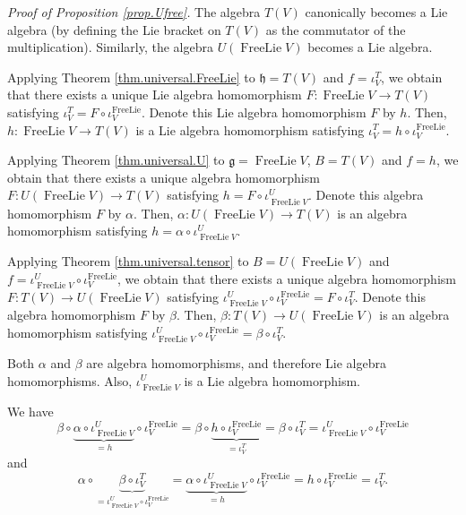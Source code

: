 \documentclass[etingof-lie.tex]{subfiles}
\begin{document}
\textit{Proof of Proposition \ref{prop.Ufree}.} The algebra $T\left(
V\right)  $ canonically becomes a Lie algebra (by defining the Lie bracket on
$T\left(  V\right)  $ as the commutator of the multiplication). Similarly, the
algebra $U\left(  \operatorname*{FreeLie}V\right)  $ becomes a Lie algebra.

Applying Theorem \ref{thm.universal.FreeLie} to $\mathfrak{h}=T\left(
V\right)  $ and $f=\iota_{V}^{T}$, we obtain that there exists a unique Lie
algebra homomorphism $F:\operatorname*{FreeLie}V\rightarrow T\left(  V\right)
$ satisfying $\iota_{V}^{T}=F\circ\iota_{V}^{\operatorname*{FreeLie}}$. Denote
this Lie algebra homomorphism $F$ by $h$. Then, $h:\operatorname*{FreeLie}%
V\rightarrow T\left(  V\right)  $ is a Lie algebra homomorphism satisfying
$\iota_{V}^{T}=h\circ\iota_{V}^{\operatorname*{FreeLie}}$.

Applying Theorem \ref{thm.universal.U} to $\mathfrak{g}%
=\operatorname*{FreeLie}V$, $B=T\left(  V\right)  $ and $f=h$, we obtain that
there exists a unique algebra homomorphism $F:U\left(  \operatorname*{FreeLie}%
V\right)  \rightarrow T\left(  V\right)  $ satisfying $h=F\circ\iota
_{\operatorname*{FreeLie}V}^{U}$. Denote this algebra homomorphism $F$ by
$\alpha$. Then, $\alpha:U\left(  \operatorname*{FreeLie}V\right)  \rightarrow
T\left(  V\right)  $ is an algebra homomorphism satisfying $h=\alpha\circ
\iota_{\operatorname*{FreeLie}V}^{U}$.

Applying Theorem \ref{thm.universal.tensor} to $B=U\left(
\operatorname*{FreeLie}V\right)  $ and $f=\iota_{\operatorname*{FreeLie}V}%
^{U}\circ\iota_{V}^{\operatorname*{FreeLie}}$, we obtain that there exists a
unique algebra homomorphism $F:T\left(  V\right)  \rightarrow U\left(
\operatorname*{FreeLie}V\right)  $ satisfying $\iota_{\operatorname*{FreeLie}%
V}^{U}\circ\iota_{V}^{\operatorname*{FreeLie}}=F\circ\iota_{V}^{T}$. Denote
this algebra homomorphism $F$ by $\beta$. Then, $\beta:T\left(  V\right)
\rightarrow U\left(  \operatorname*{FreeLie}V\right)  $ is an algebra
homomorphism satisfying $\iota_{\operatorname*{FreeLie}V}^{U}\circ\iota
_{V}^{\operatorname*{FreeLie}}=\beta\circ\iota_{V}^{T}$.

Both $\alpha$ and $\beta$ are algebra homomorphisms, and therefore Lie algebra
homomorphisms. Also, $\iota_{\operatorname*{FreeLie}V}^{U}$ is a Lie algebra homomorphism.

We have%
\[
\beta\circ\underbrace{\alpha\circ\iota_{\operatorname*{FreeLie}V}^{U}}%
_{=h}\circ\iota_{V}^{\operatorname*{FreeLie}}=\beta\circ\underbrace{h\circ
\iota_{V}^{\operatorname*{FreeLie}}}_{=\iota_{V}^{T}}=\beta\circ\iota_{V}%
^{T}=\iota_{\operatorname*{FreeLie}V}^{U}\circ\iota_{V}%
^{\operatorname*{FreeLie}}%
\]
and%
\[
\alpha\circ\underbrace{\beta\circ\iota_{V}^{T}}_{=\iota
_{\operatorname*{FreeLie}V}^{U}\circ\iota_{V}^{\operatorname*{FreeLie}}%
}=\underbrace{\alpha\circ\iota_{\operatorname*{FreeLie}V}^{U}}_{=h}\circ
\iota_{V}^{\operatorname*{FreeLie}}=h\circ\iota_{V}^{\operatorname*{FreeLie}%
}=\iota_{V}^{T}.
\]
\end{document}
